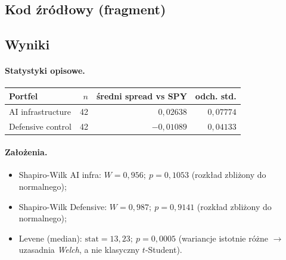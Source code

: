 \documentclass[11pt,a4paper]{article}
\begin{document}
\subsection{Kod źródłowy (fragment)}


\subsection{Wyniki}
\paragraph{Statystyki opisowe.}
\begin{center}\small
\begin{tabular}{lrrr}
\toprule
Portfel & $n$ & średni spread vs SPY & odch. std. \\
\midrule
AI infrastructure & 42 & $\phantom{-}0{,}02638$ & $0{,}07774$ \\
Defensive control & 42 & $-0{,}01089$ & $0{,}04133$ \\
\bottomrule
\end{tabular}
\end{center}

\paragraph{Założenia.}
\begin{itemize}
  \item Shapiro-Wilk AI infra: $W = 0{,}956;\ p = 0{,}1053$ (rozkład zbliżony do
        normalnego);
  \item Shapiro-Wilk Defensive: $W = 0{,}987;\ p = 0{,}9141$ (rozkład zbliżony do
        normalnego);
  \item Levene (median): $\text{stat} = 13{,}23;\ p = 0{,}0005$ (wariancje
        istotnie różne $\rightarrow$ uzasadnia \emph{Welch}, a nie klasyczny
        $t$-Student).
\end{itemize}
\end{document}
